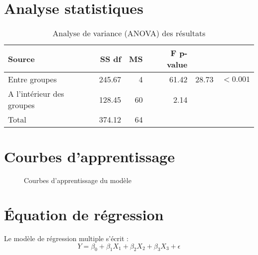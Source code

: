 \section{Analyse statistiques}

\begin{table}[H]
	\centering
	\caption{Analyse de variance (ANOVA) des résultats}
	\begin{tabular}{lrrrrr}
		\toprule
		\textbf{Source} & \textbf{SS} \textbf{df} & \textbf{MS} & \textbf{F} \textbf{p-value} \\
		\midrule
		Entre groupes & 245.67 & 4 & 61.42 & 28.73 & $< 0.001$ \\
		A l'intérieur des groupes & 128.45 & 60 & 2.14 & & \\
		Total & 374.12 & 64 & & & \\
		\bottomrule
	\end{tabular}
	\label{tab:anova-results}
\end{table}

\section{Courbes d'apprentissage}

\begin{figure}[H]
	\centering
	\caption{Courbes d'apprentissage du modèle}
	\label{fig:learning-curves}
\end{figure}

\section{Équation de régression}

Le modèle de régression multiple s'écrit :
\begin{equation}
	Y = \beta_0 + \beta_1 X_1 + \beta_2 X_2 + \beta_3 X_3 + \epsilon
	\label{Eq:regression-model}
\end{equation}

